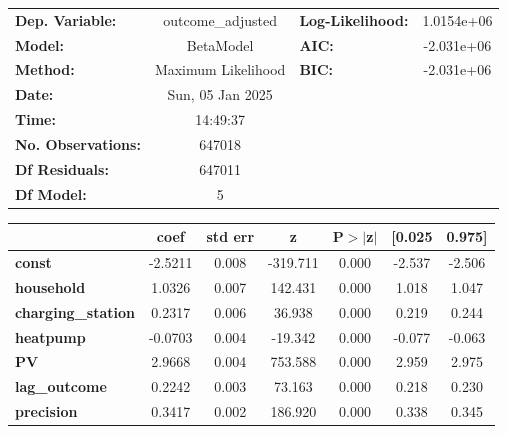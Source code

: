 \begin{center}
\begin{tabular}{lclc}
\toprule
\textbf{Dep. Variable:}    & outcome\_adjusted  & \textbf{  Log-Likelihood:    } & 1.0154e+06  \\
\textbf{Model:}            &     BetaModel      & \textbf{  AIC:               } & -2.031e+06  \\
\textbf{Method:}           & Maximum Likelihood & \textbf{  BIC:               } & -2.031e+06  \\
\textbf{Date:}             &  Sun, 05 Jan 2025  & \textbf{                     } &             \\
\textbf{Time:}             &      14:49:37      & \textbf{                     } &             \\
\textbf{No. Observations:} &       647018       & \textbf{                     } &             \\
\textbf{Df Residuals:}     &       647011       & \textbf{                     } &             \\
\textbf{Df Model:}         &            5       & \textbf{                     } &             \\
\bottomrule
\end{tabular}
\begin{tabular}{lcccccc}
                           & \textbf{coef} & \textbf{std err} & \textbf{z} & \textbf{P$> |$z$|$} & \textbf{[0.025} & \textbf{0.975]}  \\
\midrule
\textbf{const}             &      -2.5211  &        0.008     &  -319.711  &         0.000        &       -2.537    &       -2.506     \\
\textbf{household}         &       1.0326  &        0.007     &   142.431  &         0.000        &        1.018    &        1.047     \\
\textbf{charging\_station} &       0.2317  &        0.006     &    36.938  &         0.000        &        0.219    &        0.244     \\
\textbf{heatpump}          &      -0.0703  &        0.004     &   -19.342  &         0.000        &       -0.077    &       -0.063     \\
\textbf{PV}                &       2.9668  &        0.004     &   753.588  &         0.000        &        2.959    &        2.975     \\
\textbf{lag\_outcome}      &       0.2242  &        0.003     &    73.163  &         0.000        &        0.218    &        0.230     \\
\textbf{precision}         &       0.3417  &        0.002     &   186.920  &         0.000        &        0.338    &        0.345     \\
\bottomrule
\end{tabular}
\end{center}